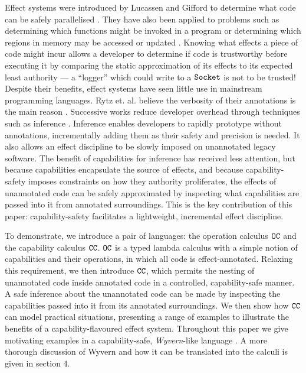 Effect systems were introduced by Lucassen and Gifford to determine what code can be safely parallelised \cite{lucassen88}. They have also been applied to problems such as determining which functions might be invoked in a program \cite{tang94} or determining which regions in memory may be accessed or updated \cite{talpin94}. Knowing what effects a piece of code might incur allows a developer to determine if code is trustworthy before executing it by comparing the static approximation of its effects to its expected least authority --- a ``logger'' which could write to a $\mathtt{Socket}$ is not to be trusted! Despite their benefits, effect systems have seen little use in mainstream programming languages. Rytz et. al. believe the verbosity of their annotations is the main reason \citep{rytz12}. Successive works reduce developer overhead through techniques such as inference \cite{CITATION_NEEDED}. Inference enables developers to rapidly prototype without annotations, incrementally adding them as their safety and precision is needed. It also allows an effect discipline to be slowly imposed on unannotated legacy software. The benefit of capabilities for inference has received less attention, but because capabilities encapsulate the source of effects, and because capability-safety imposes constraints on how they authority proliferates, the effects of unannotated code can be safely approximated by inspecting what capabilities are passed into it from annotated surroundings. This is the key contribution of this paper: capability-safety facilitates a lightweight, incremental effect discipline.

To demonstrate, we introduce a pair of languages: the operation calculus $\mathtt{OC}$ and the capability calculus $\mathtt{CC}$. $\mathtt{OC}$ is a typed lambda calculus with a simple notion of capabilities and their operations, in which all code is effect-annotated. Relaxing this requirement, we then introduce $\mathtt{CC}$, which permits the nesting of unannotated code inside annotated code in a controlled, capability-safe manner. A safe inference about the unannotated code can be made by inspecting the capabilities passed into it from its annotated surroundings. We then show how $\mathtt{CC}$ can model practical situations, presenting a range of examples to illustrate the benefits of a capability-flavoured effect system. Throughout this paper we give motivating examples in a capability-safe, \textit{Wyvern}-like language \cite{nistor13}. A more thorough discussion of Wyvern and how it can be translated into the calculi is given in section 4.



